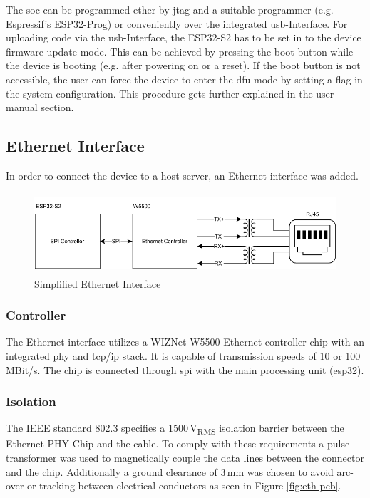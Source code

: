 The \acrshort{soc} can be programmed ether by \acrshort{jtag} and a suitable programmer (e.g. Espressif's ESP32-Prog) or conveniently over the integrated \acrshort{usb}-Interface.\newline
For uploading code via the \acrshort{usb}-Interface, the ESP32-S2 has to be set in to the device firmware update mode. This can be achieved by pressing the boot button while the device is booting (e.g. after powering on or a reset). If the boot button is not accessible, the user can force the device to enter the \acrshort{dfu} mode by setting a flag in the system configuration. This procedure gets further explained in the user manual section.
\newpage

\subsection{Ethernet Interface}
In order to connect the device to a host server, an Ethernet interface was added.

\begin{figure}[h!]
	\centering
	\includegraphics[height=3.0cm]{images/eth_interface}
	\vspace{0.2cm}
	\caption{Simplified Ethernet Interface}
	\label{fig:eth-interface}
\end{figure}

\subsubsection{Controller}
The Ethernet interface utilizes a WIZNet W5500 Ethernet controller chip with an integrated \acrshort{phy} and \acrshort{tcp/ip} stack. It is capable of transmission speeds of 10 or 100\,MBit/s. The chip is connected through \acrshort{spi} with the main processing unit (\gls{esp32}).

\subsubsection{Isolation}
The IEEE standard 802.3 specifies a 1500\,V\textsubscript{RMS} isolation barrier between the Ethernet PHY Chip and the cable. To comply with these requirements a pulse transformer was used to magnetically couple the data lines between the connector and the chip. Additionally a ground clearance of 3\,mm was chosen to avoid arc-over or tracking between electrical conductors as seen in Figure \ref{fig:eth-pcb}. 

